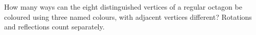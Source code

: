 How many ways can the eight distinguished vertices of a regular octagon be coloured using three named colours, with adjacent vertices different? Rotations and reflections count separately.
